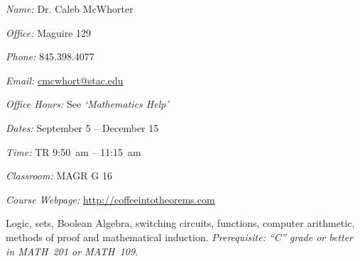 \documentclass[11pt,letterpaper]{article}
\makeatletter
\newcommand{\classdates}{September 5 -- December 15}
\newcommand{\classtimes}{TR 9:50~am -- 11:15~am}
\newcommand{\classroom}{MAGR G 16}
\newcommand{\instructor}{Dr. Caleb McWhorter}
\newcommand{\office}{Maguire 129}
\newcommand{\phone}{845.398.4077}
\newcommand{\email}{cmcwhort@stac.edu}
\newcommand{\website}{http://coffeeintotheorems.com}
\newcommand{\officehours}{See \textit{`Mathematics Help'}}
\makeatother
\begin{document}
\sectionbreak









\textit{Name:} \instructor \par
\textit{Office:} \office \par
\textit{Phone:} \phone \par
\textit{Email:} \href{mailto:\email}{\email} \par
\textit{Office Hours:} \officehours 
\pspace



\textit{Dates:} \classdates \par
\textit{Time:} \classtimes \par
\textit{Classroom:} \classroom \par
\textit{Course Webpage:} \href{\website}{\website}
\sectionbreak





\newpage




Logic, sets, Boolean Algebra, switching circuits, functions, computer arithmetic, methods of proof and mathematical induction. {\itshape Prerequisite: ``C'' grade or better in MATH~201 or MATH~109.} \pspace
\end{document}
